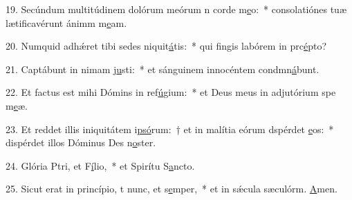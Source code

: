 19. Secúndum multitúdinem dolórum meórum n corde m\uline{e}o:~* consolatiónes tuæ lætificavérunt ánimm m\uline{e}am.\par 
20. Numquid adhǽret tibi sedes niquit\uline{á}tis:~* qui fingis labórem in prc\uline{é}pto?\par 
21. Captábunt in nimam j\uline{u}sti:~* et sánguinem innocéntem condmn\uline{á}bunt.\par 
22. Et factus est mihi Dómins in ref\uline{ú}gium:~* et Deus meus in adjutórium spe m\uline{e}æ.\par 
23. Et reddet illis iniquitátem i\uline{psó}rum:~† et in malítia eórum dspérdet \uline{e}os:~* dispérdet illos Dóminus Des n\uline{o}ster.\par 
24. Glória Ptri, et F\uline{í}lio,~* et Spirítu S\uline{a}ncto.\par 
25. Sicut erat in princípio, t nunc, et s\uline{e}mper,~* et in sǽcula sæculórm. \uline{A}men.\par 
